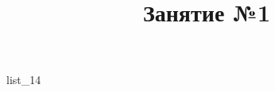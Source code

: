 \documentclass[12pt, a4paper]{article}
\begin{document}
	\title{Занятие №1}
	{list_14}
\end{document}
